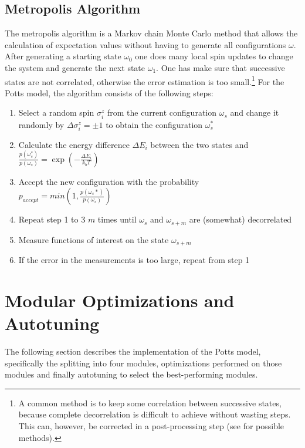 \documentclass[letterpaper]{article}
\begin{document}
\subsection{Metropolis Algorithm}
The metropolis algorithm is a Markov chain Monte Carlo method \cite{MC} that
allows the calculation of expectation values without having to generate
all configurations $\omega$. After generating a starting state $\omega_{0}$
one does many local spin updates to change the system and generate
the next state $\omega_{1}$. One has make sure that successive states are
not correlated, otherwise the error estimation is too small.\footnote{A common method is to keep some correlation between successive states, because complete decorrelation is difficult to achieve without wasting steps. This can, however, be corrected in a post-processing step (see \cite{Jackknife} for possible methods).} For
the Potts model, the algorithm consists of the following steps:
\begin{enumerate}[noitemsep, topsep = 0pt]
\item Select a random spin $\sigma_{i}^{z}$ from the current configuration
$\omega_{s}$ and change it randomly by $\Delta\sigma_{i}^{z}=\pm1$
to obtain the configuration $\omega_{s}^{*}$
\item Calculate the energy difference $\Delta E_{i}$ between the two states and  $\frac{p(\omega_{s}^{*})}{p(\omega_{s})}=\exp{\left(-\frac{\Delta E_{i}}{k_{b}T}\right)}$
\item Accept the new configuration with the probability
\\ $p_{accept}=min(1,\frac{p(\omega_{s}*)}{p(\omega_{s})})$
\item Repeat step 1 to 3 $m$ times until $\omega_{s}$ and $\omega_{s+m}$
are (somewhat) decorrelated
\item Measure functions of interest on the state $\omega_{s+m}$
\item If the error in the measurements is too large, repeat from step 1\end{enumerate}
\section{Modular Optimizations and Autotuning}\label{sec:yourmethod}
The following section describes the implementation of the Potts model, specifically the splitting into four modules, optimizations performed on those modules and finally autotuning to select the best-performing modules.
\end{document}
